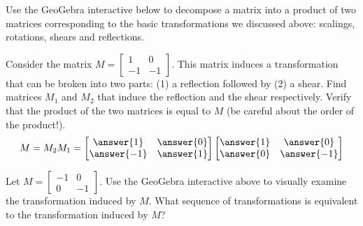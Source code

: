 \documentclass{ximera}
\begin{document}
\begin{exploration}\label{exp:matrixComp}
Use the GeoGebra interactive below to decompose a matrix into a product of two matrices corresponding to the basic transformations we discussed above: scalings, rotations, shears and reflections.

Consider the matrix $M=\begin{bmatrix} 1 & 0\\-1 & -1\end{bmatrix}$.  This matrix induces a transformation that can be broken into two parts: (1) a reflection followed by (2) a shear.  Find matrices $M_1$ and $M_2$ that induce the reflection and the shear respectively.  Verify that the product of the two matrices is equal to $M$ (be careful about the order of the product!).
$$M=M_2M_1=\begin{bmatrix}\answer{1}&\answer{0}\\\answer{-1}&\answer{1}\end{bmatrix}\begin{bmatrix}\answer{1}&\answer{0}\\\answer{0}&\answer{-1}\end{bmatrix}$$


\begin{onlineOnly}
\begin{center}
\end{center}
\end{onlineOnly}

Let  $M=\begin{bmatrix}-1&0\\0&-1\end{bmatrix}$.  Use the GeoGebra interactive above to visually examine the transformation induced by $M$.  What sequence of transformations is equivalent to the transformation induced by $M$? 
\begin{multipleChoice}  
\end{multipleChoice} 


\end{exploration}
\end{document}
